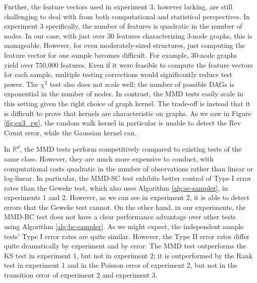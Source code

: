 \documentclass[a4paper,12pt]{article}
\begin{document}
Further, the feature vectors used in experiment 3, however lacking, are still challenging to deal with from both computational and statistical perspectives. In experiment 3 specifically, the number of features is quadratic in the number of nodes. In our case, with just over 30 features characterizing 3-node graphs, this is manageable. However, for even moderately-sized structures, just computing the feature vector for one sample becomes difficult. For example, 30-node graphs yield over 750,000 features. Even if it were feasible to compute the feature vectors for each sample, multiple testing corrections would significantly reduce test power. The $\chi^{2}$ test also does not scale well; the number of possible DAGs is exponential in the number of nodes. In contrast, the MMD tests easily scale in this setting given the right choice of graph kernel. The trade-off is instead that it is difficult to prove that kernels are characteristic on graphs. As we saw in Figure \ref{fig:ex3_rw}, the random walk kernel in particular is unable to detect the Rev Count error, while the Gaussian kernel can.

In $\mathbb{R}^{d}$, the MMD tests perform competitively compared to existing tests of the same class. However, they are much more expensive to conduct, with computational costs quadratic in the number of observations rather than linear or log-linear. In particular, the MMD-SC test exhibits better control of Type I error rates than the Geweke test, which also uses Algorithm \ref{alg:sc-sampler}, in experiments 1 and 2. However, as we can see in experiment 2, it is able to detect errors that the Geweke test cannot. On the other hand, in our experiments, the MMD-BC test does not have a clear performance advantage over other tests using Algorithm \ref{alg:bc-sampler}. As we might expect, the independent sample tests' Type I error rates are quite similar. However, the Type II error rates differ quite dramatically by experiment and by error. The MMD test outperforms the KS test in experiment 1, but not in experiment 2; it is outperformed by the Rank test in experiment 1 and in the Poisson error of experiment 2, but not in the transition error of experiment 2 and experiment 3. 
\end{document}

